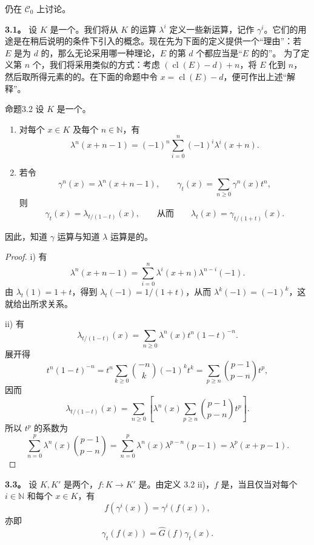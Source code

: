 仍在 $\mathscr C_0$ 上讨论。

\textbf{3.1。} 设 $K$ 是一个。我们将从 $K$ 的运算 $\lambda^i$ 定义一些新运算，记作 $\gamma^i$。它们的用途是在稍后说明的条件下引入的概念。现在先为下面的定义提供一个“理由”：若 $E$ 是为 $d$ 的，那么无论采用哪一种理论，$E$ 的第 $d$ 个都应当是“$E$ 的的”。
为了定义第 $n$ 个，我们将采用类似的方式：考虑 $(\operatorname{cl}(E)-d)+n$，将 $E$ 化到 $n$，然后取所得元素的的。在下面的命题中令 $x=\operatorname{cl}(E)-d$，便可作出上述“解释”。

\begin{SGAresult}{命题}{3.2}
设 $K$ 是一个。
\begin{enumerate}
\item[i)] 对每个 $x\in K$ 及每个 $n\in\mathbb N$，有
\[
\lambda^n(x+n-1)=(-1)^n\sum_{i=0}^n(-1)^i\lambda^i(x+n).
\]
\item[ii)] 若令
\[
\gamma^n(x)=\lambda^n(x+n-1),\qquad
\gamma_t(x)=\sum_{n\geqslant0}\gamma^n(x)t^n,
\]
则
\[
\gamma_t(x)=\lambda_{t/(1-t)}(x),\qquad\text{从而}\qquad
\lambda_t(x)=\gamma_{t/(1+t)}(x).
\]
\end{enumerate}
因此，知道 $\gamma$ 运算与知道 $\lambda$ 运算是的。
\end{SGAresult}
\begin{proof}
i) 有
\[
\lambda^n(x+n-1)=\sum_{i=0}^n\lambda^i(x+n)\lambda^{n-i}(-1).
\]
由 $\lambda_t(1)=1+t$，得到 $\lambda_t(-1)=1/(1+t)$，从而 $\lambda^k(-1)=(-1)^k$，这就给出所求关系。

 ii) 有
\[
\lambda_{t/(1-t)}(x)=\sum_{n\geqslant0}\lambda^n(x)t^n(1-t)^{-n}.
\]
展开得
\[
t^n(1-t)^{-n}=t^n\sum_{k\geqslant0}\binom{-n}{k}(-1)^kt^k
=\sum_{p\geqslant n}\binom{p-1}{p-n}t^p,
\]
因而
\[
\lambda_{t/(1-t)}(x)
=\sum_{n\geqslant0}\left[\lambda^n(x)\sum_{p\geqslant n}\binom{p-1}{p-n}t^p\right].
\]
所以 $t^p$ 的系数为
\[
\sum_{n=0}^p\lambda^n(x)\binom{p-1}{p-n}
=\sum_{n=0}^p\lambda^n(x)\lambda^{p-n}(p-1)
=\lambda^p(x+p-1).
\]
\end{proof}

\textbf{3.3。} 设 $K,K'$ 是两个，$f:K\longrightarrow K'$ 是。由定义 3.2 ii)，$f$ 是，当且仅当对每个 $i\in\mathbb N$ 和每个 $x\in K$，有
\[
f(\gamma^i(x))=\gamma^i(f(x)),
\]
亦即
\[
\gamma_t(f(x))=\widehat G(f)\gamma_t(x).
\]

